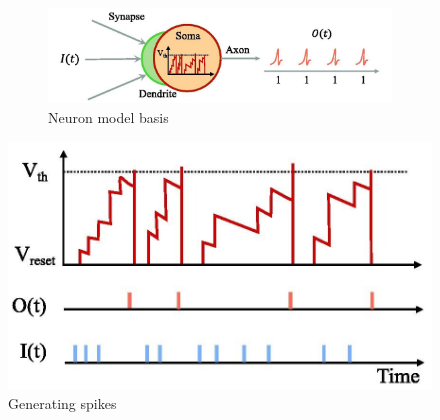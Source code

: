 \documentclass[11pt]{article}
\begin{document}
\begin{figure}[H]
  \begin{minipage}{0.5\textwidth}
    \begin{figure}[H]
      \begin{center}
        \includegraphics{image/neuronmodel.jpg}
        \caption{Neuron model basis\cite{LIAO2023126470}}
        \label{fig:neuronmodel}
      \end{center}
    \end{figure}
  \end{minipage}
  \hspace{0.5cm}
  \begin{minipage}{0.5\textwidth}
    \begin{center}
      \includegraphics{image/generating_spikes.jpg}
      \caption{Generating spikes\cite{LIAO2023126470}}
      \label{fig:generating_spikes}
    \end{center}
  \end{minipage}
\end{figure}
\end{document}
